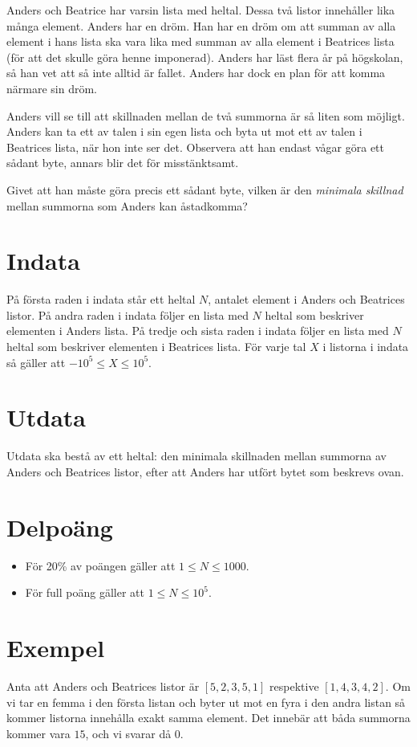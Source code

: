 
Anders och Beatrice har varsin lista med heltal. Dessa två listor innehåller lika många element. Anders har en dröm. Han har en dröm om att summan av alla element i hans lista ska vara lika med summan av alla element i Beatrices lista (för att det skulle göra henne imponerad). Anders har läst flera år på högskolan, så han vet att så inte alltid är fallet. Anders har dock en plan för att komma närmare sin dröm.

Anders vill se till att skillnaden mellan de två summorna är så liten som möjligt. Anders kan ta ett av talen i sin egen lista och byta ut mot ett av talen i Beatrices lista, när hon inte ser det. Observera att han endast vågar göra ett sådant byte, annars blir det för misstänktsamt.

Givet att han måste göra precis ett sådant byte, vilken är den \emph{minimala skillnad} mellan summorna som Anders kan åstadkomma?

\section*{Indata}
På första raden i indata står ett heltal $N$, antalet element i Anders och Beatrices listor. På andra raden i indata följer en lista med $N$ heltal som beskriver elementen i Anders lista. På tredje och sista raden i indata följer en lista med $N$ heltal som beskriver elementen i Beatrices lista. För varje tal $X$ i listorna i indata så gäller att $-10^5 \leq X \leq 10^5$.

\section*{Utdata}
Utdata ska bestå av ett heltal: den minimala skillnaden mellan summorna av Anders och Beatrices listor, efter att Anders har utfört bytet som beskrevs ovan.

\section*{Delpoäng}
\begin{itemize}
\item För 20\% av poängen gäller att $1 \leq N \leq 1000$.
\item För full poäng gäller att $1 \leq N \leq 10^{5}$.
\end{itemize}

\section*{Exempel}
Anta att Anders och Beatrices listor är $[5,2,3,5,1]$ respektive $[1,4,3,4,2]$. Om vi tar en femma i den första listan och byter ut mot en fyra i den andra listan så kommer listorna innehålla exakt samma element. Det innebär att båda summorna kommer vara $15$, och vi svarar då $0$.
